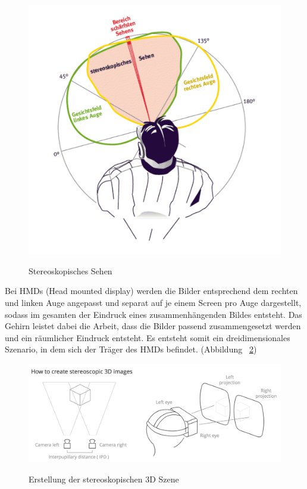 \begin{figure}[ht]
\vspace*{1em}
\centering
\caption{Stereoskopisches Sehen}
\includegraphics[width=\textwidth]{images/stereoskopischesSehen.png}
\label{fig:stereoskopischesSehen} 
\end{figure}

Bei HMDs (Head mounted display) werden die Bilder entsprechend dem rechten und linken Auge angepasst und separat auf je einem Screen pro Auge dargestellt, sodass im gesamten der Eindruck eines zusammenhängenden Bildes entsteht. Das Gehirn leistet dabei die Arbeit, dass die Bilder passend zusammengesetzt werden und ein räumlicher Eindruck entsteht. Es entsteht somit ein dreidimensionales Szenario, in dem sich der Träger des HMDs befindet. (Abbildung ~\ref{fig:howToCreate})

\begin{figure}[ht]
\vspace*{1em}
\centering
\caption{Erstellung der stereoskopischen 3D Szene}
\includegraphics[width=\textwidth]{images/howToCreate.png}
\label{fig:howToCreate} 
\end{figure}

